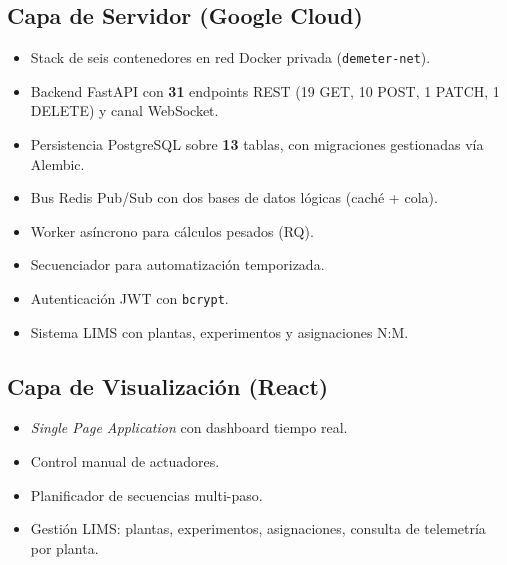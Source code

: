 \subsection{Capa de Servidor (Google Cloud)}
\begin{itemize}[leftmargin=*]
    \item Stack de seis contenedores en red Docker privada
    (\texttt{demeter-net}).
    \item Backend FastAPI con \textbf{31} endpoints REST (19 GET, 10 POST,
    1 PATCH, 1 DELETE) y canal WebSocket.
    \item Persistencia PostgreSQL sobre \textbf{13} tablas, con migraciones
    gestionadas v\'ia Alembic.
    \item Bus Redis Pub/Sub con dos bases de datos l\'ogicas (cach\'e + cola).
    \item Worker as\'incrono para c\'alculos pesados (RQ).
    \item Secuenciador para automatizaci\'on temporizada.
    \item Autenticaci\'on JWT con \texttt{bcrypt}.
    \item Sistema LIMS con plantas, experimentos y asignaciones N:M.
\end{itemize}

\subsection{Capa de Visualizaci\'on (React)}
\begin{itemize}[leftmargin=*]
    \item \textit{Single Page Application} con dashboard tiempo real.
    \item Control manual de actuadores.
    \item Planificador de secuencias multi-paso.
    \item Gesti\'on LIMS: plantas, experimentos, asignaciones,
    consulta de telemetr\'ia por planta.
\end{itemize}


